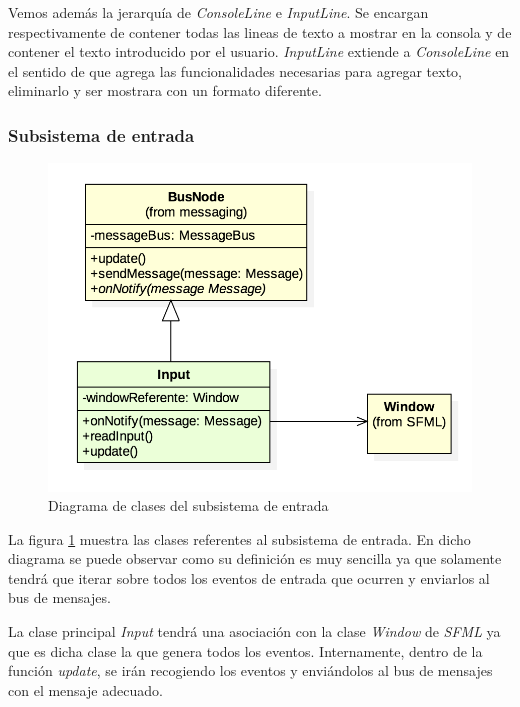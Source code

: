 \bigskip

Vemos además la jerarquía de \textit{ConsoleLine} e \textit{InputLine}. Se encargan respectivamente de contener todas las lineas de texto a mostrar en la consola y de contener el texto introducido por el usuario. \textit{InputLine} extiende a \textit{ConsoleLine} en el sentido de que agrega las funcionalidades necesarias para agregar texto, eliminarlo y ser mostrara con un formato diferente.

\subsubsection*{Subsistema de entrada}

\begin{figure}
	\centerline{\includegraphics[width=12cm]{otros/UML/png/alld/png/input__diagramaDeClases_input_8.png}}
	\caption{Diagrama de clases del subsistema de entrada}
	\label{class:input}
\end{figure}

La figura \ref{class:input} muestra las clases referentes al subsistema de entrada. En dicho diagrama se puede observar como su definición es muy sencilla ya que solamente tendrá que iterar sobre todos los eventos de entrada que ocurren y enviarlos al bus de mensajes.

\bigskip

La clase principal \textit{Input} tendrá una asociación con la clase \textit{Window} de \textit{SFML} ya que es dicha clase la que genera todos los eventos. Internamente, dentro de la función \textit{update}, se irán recogiendo los eventos y enviándolos al bus de mensajes con el mensaje adecuado.


